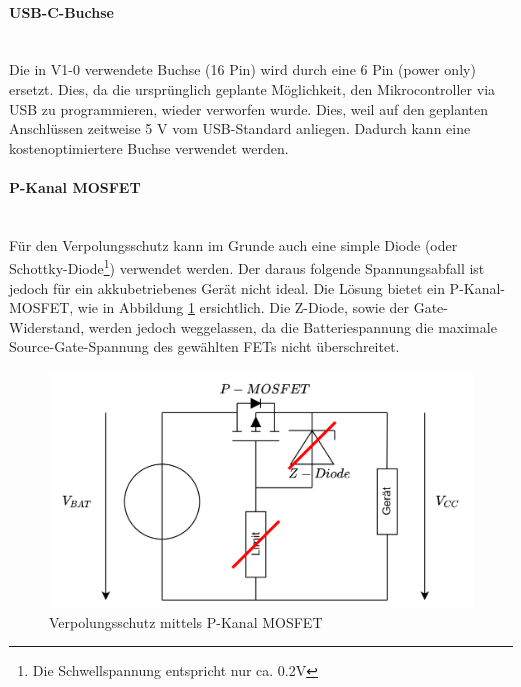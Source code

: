 \documentclass[12pt]{article}
\begin{document}
	\paragraph{USB-C-Buchse}\mbox{}\\
	Die in V1-0 verwendete Buchse (16 Pin) wird durch eine 6 Pin (power only) ersetzt. Dies, da die ursprünglich geplante Möglichkeit, den Mikrocontroller via USB zu programmieren, wieder verworfen wurde. Dies, weil auf den geplanten Anschlüssen zeitweise 5 V vom USB-Standard anliegen. Dadurch kann eine kostenoptimiertere Buchse verwendet werden.
	\paragraph{P-Kanal MOSFET} \label{P-Kanal MOSFET} \mbox{}\\
	Für den Verpolungsschutz kann im Grunde auch eine simple Diode (oder Schottky-Diode\footnote{Die Schwellspannung entspricht nur ca. 0.2V}) verwendet werden. Der daraus folgende Spannungsabfall ist jedoch für ein akkubetriebenes Gerät nicht ideal. Die Lösung bietet ein P-Kanal-MOSFET, wie in Abbildung \ref{fig:batverpolungsschutz} ersichtlich. Die Z-Diode, sowie der Gate-Widerstand, werden jedoch weggelassen, da die Batteriespannung die maximale Source-Gate-Spannung des gewählten FETs nicht überschreitet.
	\begin{figure}[H]
		\centering
		\includegraphics[width=0.7\linewidth]{images/BAT_Verpolungsschutz}
		\caption{Verpolungsschutz mittels P-Kanal MOSFET}
		\label{fig:batverpolungsschutz}
	\end{figure}
	
\end{document}

